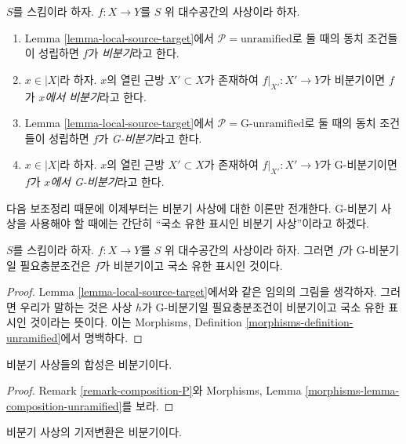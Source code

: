 \begin{definition}
\label{definition-unramified}
$S$를 스킴이라 하자.
$f : X \to Y$를 $S$ 위 대수공간의 사상이라 하자.
\begin{enumerate}
\item Lemma \ref{lemma-local-source-target}에서 $\mathcal{P} =
\text{unramified}$로 둘 때의 동치 조건들이 성립하면 $f$가 {\it 비분기}라고
한다.
\item $x \in |X|$라 하자. $x$의 열린 근방 $X' \subset X$가 존재하여
$f|_{X'} : X' \to Y$가 비분기이면 $f$가 {\it $x$에서 비분기}라고 한다.
\item Lemma \ref{lemma-local-source-target}에서 $\mathcal{P} =
\text{G-unramified}$로 둘 때의 동치 조건들이 성립하면 $f$가 {\it G-비분기}라고
한다.
\item $x \in |X|$라 하자. $x$의 열린 근방 $X' \subset X$가 존재하여
$f|_{X'} : X' \to Y$가 G-비분기이면 $f$가 {\it $x$에서 G-비분기}라고 한다.
\end{enumerate}
\end{definition}

\noindent
다음 보조정리 때문에 이제부터는 비분기 사상에 대한 이론만 전개한다.
G-비분기 사상을 사용해야 할 때에는 간단히 “국소 유한 표시인 비분기
사상”이라고 하겠다.

\begin{lemma}
\label{lemma-unramified-G-unramified}
$S$를 스킴이라 하자.
$f : X \to Y$를 $S$ 위 대수공간의 사상이라 하자.
그러면 $f$가 G-비분기일 필요충분조건은 $f$가 비분기이고 국소 유한
표시인 것이다.
\end{lemma}

\begin{proof}
Lemma \ref{lemma-local-source-target}에서와 같은 임의의 그림을 생각하자.
그러면 우리가 말하는 것은 사상 $h$가 G-비분기일 필요충분조건이
비분기이고 국소 유한 표시인 것이라는 뜻이다. 이는 Morphisms, Definition
\ref{morphisms-definition-unramified}에서 명백하다.
\end{proof}

\begin{lemma}
\label{lemma-composition-unramified}
비분기 사상들의 합성은 비분기이다.
\end{lemma}

\begin{proof}
Remark \ref{remark-composition-P}와 Morphisms, Lemma
\ref{morphisms-lemma-composition-unramified}를 보라.
\end{proof}

\begin{lemma}
\label{lemma-base-change-unramified}
비분기 사상의 기저변환은 비분기이다.
\end{lemma}

